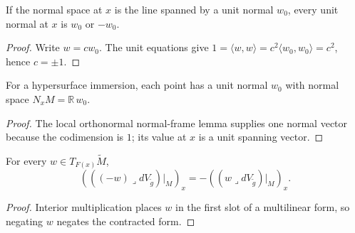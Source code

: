 \begin{lemma}
\label{lem:two-unit-normals}





If the normal space at $x$ is the line spanned by a unit normal $w_0$, every unit normal at $x$ is $w_0$ or $-w_0$.
\end{lemma}

\begin{proof}

\sketch Write $w=cw_0$. The unit equations give $1=\langle w,w\rangle=c^2\langle w_0,w_0\rangle=c^2$, hence $c=\pm1$.
\end{proof}

\begin{lemma}
\label{lem:pointwise-unit-normal-span}





For a hypersurface immersion, each point has a unit normal $w_0$ with normal space $N_xM=\mathbb R\,w_0$.
\end{lemma}

\begin{proof}

\sketch The local orthonormal normal-frame lemma supplies one normal vector because the codimension is $1$; its value at $x$ is a unit spanning vector.
\end{proof}

\begin{lemma}
\label{lem:normal-restrict-neg-normal}





For every $w\in T_{F(x)}\widetilde M$,
\[
(((-w)\lrcorner dV_{\widetilde g})|_M)_x=-((w\lrcorner dV_{\widetilde g})|_M)_x.
\]
\end{lemma}

\begin{proof}

\sketch Interior multiplication places $w$ in the first slot of a multilinear form, so negating $w$ negates the contracted form.
\end{proof}

